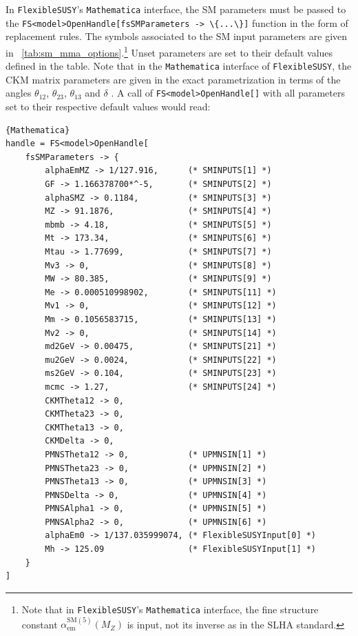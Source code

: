 \documentclass[final,3p,11pt,pdflatex]{elsarticle}
\makeatletter
\newcommand{\fs}{\texttt{FlexibleSUSY}\@\xspace}
\newcommand{\mathematica}{\texttt{Ma\-the\-ma\-ti\-ca}\xspace}
\newcommand{\code}[1]{\lstinline|#1|}  %
\newcommand{\SM}{\ensuremath{\text{SM}}\xspace}
\newcommand{\tabref}[1]{\tablename~\ref{#1}}
\def\aem{\alpha_{\text{em}}}
\makeatother
\begin{document}
In \fs's \mathematica interface, the SM parameters must be
passed to the \code{FS<model>OpenHandle[fsSMParameters -> \{...\}]}
function in the form of replacement rules.  The symbols associated to the
SM input parameters are given in
\tabref{tab:sm_mma_options}.\footnote{Note that in \fs's \mathematica
  interface, the fine structure constant $\aem^{\SM(5)}(M_Z)$ is input,
  not its inverse as in the SLHA standard.}
Unset parameters are set to their
default values defined in the table.  Note that in the \mathematica
interface of \fs, the CKM matrix parameters are given in the
exact parametrization in terms of the angles $\theta_{12}$,
$\theta_{23}$, $\theta_{13}$ and $\delta$ \cite{Olive:2016xmw}.  A
call of \code{FS<model>OpenHandle[]} with all parameters set to their
respective default values would read:
%
\begin{lstlisting}{Mathematica}
handle = FS<model>OpenHandle[
    fsSMParameters -> {
        alphaEmMZ -> 1/127.916,      (* SMINPUTS[1] *)
        GF -> 1.166378700*^-5,       (* SMINPUTS[2] *)
        alphaSMZ -> 0.1184,          (* SMINPUTS[3] *)
        MZ -> 91.1876,               (* SMINPUTS[4] *)
        mbmb -> 4.18,                (* SMINPUTS[5] *)
        Mt -> 173.34,                (* SMINPUTS[6] *)
        Mtau -> 1.77699,             (* SMINPUTS[7] *)
        Mv3 -> 0,                    (* SMINPUTS[8] *)
        MW -> 80.385,                (* SMINPUTS[9] *)
        Me -> 0.000510998902,        (* SMINPUTS[11] *)
        Mv1 -> 0,                    (* SMINPUTS[12] *)
        Mm -> 0.1056583715,          (* SMINPUTS[13] *)
        Mv2 -> 0,                    (* SMINPUTS[14] *)
        md2GeV -> 0.00475,           (* SMINPUTS[21] *)
        mu2GeV -> 0.0024,            (* SMINPUTS[22] *)
        ms2GeV -> 0.104,             (* SMINPUTS[23] *)
        mcmc -> 1.27,                (* SMINPUTS[24] *)
        CKMTheta12 -> 0,
        CKMTheta23 -> 0,
        CKMTheta13 -> 0,
        CKMDelta -> 0,
        PMNSTheta12 -> 0,            (* UPMNSIN[1] *)
        PMNSTheta23 -> 0,            (* UPMNSIN[2] *)
        PMNSTheta13 -> 0,            (* UPMNSIN[3] *)
        PMNSDelta -> 0,              (* UPMNSIN[4] *)
        PMNSAlpha1 -> 0,             (* UPMNSIN[5] *)
        PMNSAlpha2 -> 0,             (* UPMNSIN[6] *)
        alphaEm0 -> 1/137.035999074, (* FlexibleSUSYInput[0] *)
        Mh -> 125.09                 (* FlexibleSUSYInput[1] *)
    }
]
\end{lstlisting}
%
\end{document}
